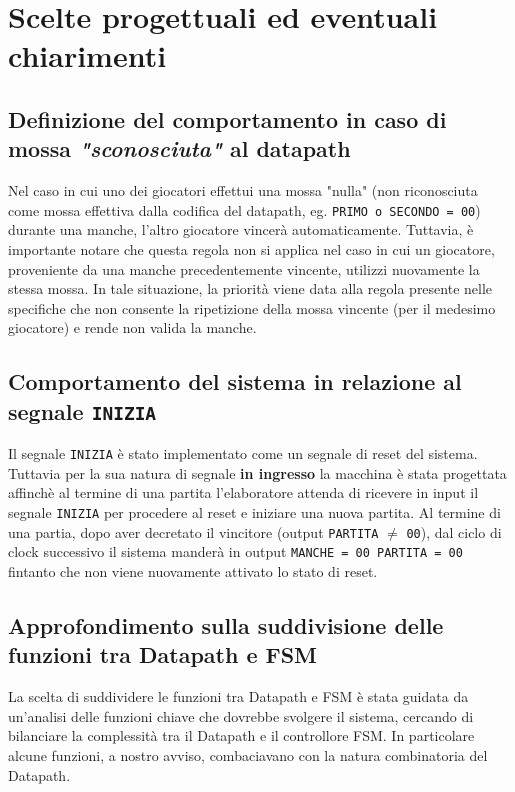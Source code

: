 \documentclass[a4paper]{report}
\begin{document}
\chapter{Scelte progettuali ed eventuali chiarimenti}
\section{Definizione del comportamento in caso di mossa \textit{"sconosciuta"} al datapath}
Nel caso in cui uno dei giocatori effettui una mossa "nulla" (non riconosciuta come mossa effettiva dalla codifica del datapath, eg. \texttt{PRIMO o SECONDO = 00}) durante una manche, l'altro giocatore vincerà automaticamente.
Tuttavia, è importante notare che questa regola non si applica nel caso in cui un giocatore, proveniente da una manche precedentemente vincente, utilizzi nuovamente la stessa mossa.
In tale situazione, la priorità viene data alla regola presente nelle specifiche che non consente la ripetizione della mossa vincente (per il medesimo giocatore) e rende non valida la manche.

\section{Comportamento del sistema in relazione al segnale \texttt{INIZIA}}
Il segnale \texttt{INIZIA} è stato implementato come un segnale di reset del sistema.
Tuttavia per la sua natura di segnale \textbf{in ingresso} la macchina è stata progettata affinchè al termine di una partita l'elaboratore attenda di ricevere in input il segnale \texttt{INIZIA} per procedere al reset e iniziare una nuova partita.
Al termine di una partia, dopo aver decretato il vincitore (output \texttt{PARTITA} $\neq$ \texttt{00}), dal ciclo di clock successivo il sistema manderà in output \texttt{MANCHE = 00 PARTITA = 00} fintanto che non viene nuovamente attivato lo stato di reset. 

\section{Approfondimento sulla suddivisione delle funzioni tra Datapath e FSM}\label{sec:approfondimento}
La scelta di suddividere le funzioni tra Datapath e FSM è stata guidata da un'analisi delle funzioni chiave che dovrebbe svolgere il sistema, cercando di bilanciare la complessità tra il Datapath e il controllore FSM.
In particolare alcune funzioni, a nostro avviso, combaciavano con la natura combinatoria del Datapath. 
\end{document}
